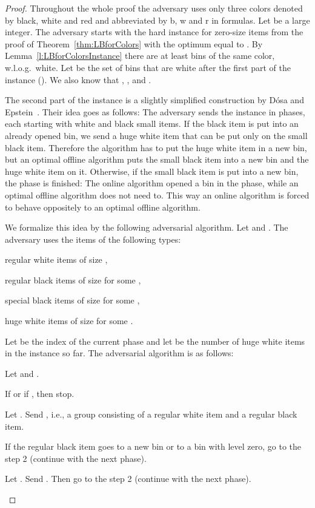 \documentclass[11pt,a4paper]{article}
\begin{document}
\begin{proof}
Throughout the whole proof the adversary uses only three colors denoted by black, white and red 
and abbreviated by b, w and r in formulas. 
Let  be a large integer.
The adversary starts with the hard instance for zero-size items from the proof of Theorem~\ref{thm:LBforColors}
with the optimum equal to . By Lemma~\ref{l:LBforColorsInstance} there are at least  bins 
of the same color, w.l.o.g.\ white.
Let  be the set of bins that are white after the first part of the instance ().
We also know that , ,
and . 

The second part of the instance is a slightly simplified construction by D\'osa and Epstein~\cite{DosEps14}.
Their idea goes as follows: The adversary sends the instance in phases, 
each starting with white and black small items. If the black item is put into an already opened bin,
we send a huge white item that can be put only on the small black item.
Therefore the algorithm has to put the huge white item in a new bin, but an optimal offline
algorithm puts the small black item into a new bin and the huge white item on it.
Otherwise, if the small black item is put into a new bin, the phase is finished:
The online algorithm opened a bin in the phase, while an optimal offline algorithm does not need to.
This way an online algorithm is forced to behave oppositely to an optimal offline algorithm.

We formalize this idea by the following adversarial algorithm. Let  and
. The adversary uses the items of the following types:
\begin{compactitem}
\item regular white items of size ,
\item regular black items of size  for some ,
\item special black items of size  for some ,
\item huge white items of size  for some .
\end{compactitem}

Let  be the index of the current phase and let  be the number of huge white items
in the instance so far. The adversarial algorithm is as follows:
\begin{compactenum}
\item Let  and .
\item If  or if , then stop.
\item Let . Send , i.e., a group consisting
of a regular white item and a regular black item.
\item If the regular black item goes to a new bin or to a bin with level zero, go to the step 2
(continue with the next phase).
\item Let . Send
.
Then go to the step 2 (continue with the next phase).
\end{compactenum}


\end{proof}
\end{document}
